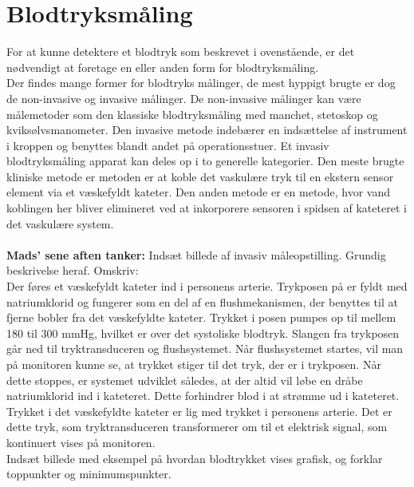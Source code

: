 \section{Blodtryksmåling}
For at kunne detektere et blodtryk som beskrevet i ovenstående, er det nødvendigt at foretage en eller anden form for blodtryksmåling. \\
Der findes mange former for blodtryks målinger, de mest hyppigt brugte er dog de non-invasive og invasive målinger. De non-invasive målinger kan være målemetoder som den klassiske blodtryksmåling med manchet, stetoskop og kviksølvsmanometer. Den invasive metode indebærer en indsættelse af instrument i kroppen og benyttes blandt andet på operationsstuer. Et invasiv blodtryksmåling apparat kan deles op i to generelle kategorier. Den meste brugte kliniske metode er metoden er at koble det vaskulære tryk til en ekstern sensor element via et væskefyldt kateter. Den anden metode er en metode, hvor vand koblingen her bliver elimineret ved at inkorporere sensoren i spidsen af kateteret i det vaskulære system.\\
\\
\textbf{Mads' sene aften tanker:}
Indsæt billede af invasiv måleopstilling. Grundig beskrivelse heraf. Omskriv:\\
Der føres et væskefyldt kateter ind i personens arterie. Trykposen på er fyldt med natriumklorid og fungerer som en del af en flushmekanismen, der benyttes til at fjerne bobler fra det væskefyldte kateter. Trykket i posen pumpes op til mellem 180 til 300 mmHg, hvilket er over det systoliske blodtryk.
Slangen fra trykposen går ned til tryktransduceren og flushsystemet. Når flushsystemet startes, vil man på monitoren kunne se, at trykket stiger til det tryk, der er i trykposen. Når dette stoppes, er systemet udviklet således, at der altid vil løbe en dråbe natriumklorid ind i kateteret. Dette forhindrer blod i at strømme ud i kateteret. Trykket i det væskefyldte kateter er lig med trykket i personens arterie. Det er dette tryk, som tryktransduceren transformerer om til et elektrisk signal, som kontinuert vises på monitoren.\\
Indsæt billede med eksempel på hvordan blodtrykket vises grafisk, og forklar toppunkter og minimumspunkter.

